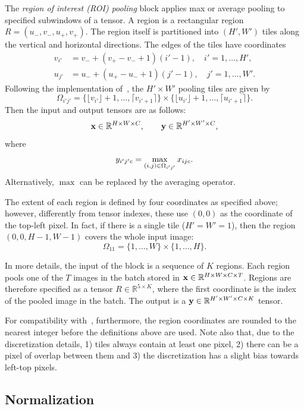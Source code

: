 The \emph{region of interest (ROI) pooling} block applies max or average pooling to specified subwindows of a tensor. A region is a rectangular region $R = (u_-,v_-,u_+,v_+)$. The region itself is partitioned into $(H',W')$ tiles along the vertical and horizontal directions. The edges of the tiles have coordinates
\begin{align*}
v_{i'} &= v_- + (v_+ - v_- + 1) (i' - 1), \quad i' = 1,\dots,H',\\
u_{j'} &= u_- + (u_+ - u_- + 1) (j' - 1), \quad j' = 1,\dots,W'.
\end{align*}
Following the implementation of~\cite{girshick15fast}, the $H'\times W'$ pooling tiles are given by
\[
\Omega_{i'j'} =
\{\lfloor v_{i'} \rfloor + 1, \dots, \lceil v_{i'+1} \rceil\}
\times
\{\lfloor u_{i'} \rfloor + 1, \dots, \lceil u_{i'+1} \rceil\}.
\]
Then the input and output tensors are as follows:
\[
\mathbf{x} \in \mathbb{R}^{H \times W \times C},
\qquad
\mathbf{y} \in \mathbb{R}^{H' \times W' \times C},
\]
where
\[
y_{i'j'c} = \operatornamewithlimits{max}_{(i,j) \in \Omega_{i'j'}} x_{ijc}.
\]
Alternatively, $\max$ can be replaced by the averaging operator.

The extent of each region is defined by four coordinates as specified above; however, differently from tensor indexes, these use $(0,0)$ as the coordinate of the top-left pixel. In fact, if there is a single tile ($H'=W'=1$), then the region $(0,0,H-1,W-1)$ covers the whole input image:
\[
\Omega_{11} =
\{1, \dots, W\}
\times
\{1, \dots, H\}.
\]

In more details, the input of the block is a sequence of $K$ regions. Each region pools one of the $T$ images in the batch stored in $\mathbf{x} \in \mathbb{R}^{H\times W\times C\times T}$. Regions are therefore specified as a tensor $R \in \mathbb{R}^{5 \times K}$, where the first coordinate is the index of the pooled image in the batch. The output is a $\mathbf{y} \in \mathbb{R}^{H' \times W' \times C \times K}$ tensor.

For compatibility with~\cite{girshick15fast}, furthermore, the region coordinates are rounded to the nearest integer before the definitions above are used. Note also that, due to the discretization details, 1) tiles always contain at least one pixel, 2) there can be a pixel of overlap between them and 3) the discretization has a slight bias towards left-top pixels.

\subsection{Normalization}\label{s:normalization}

